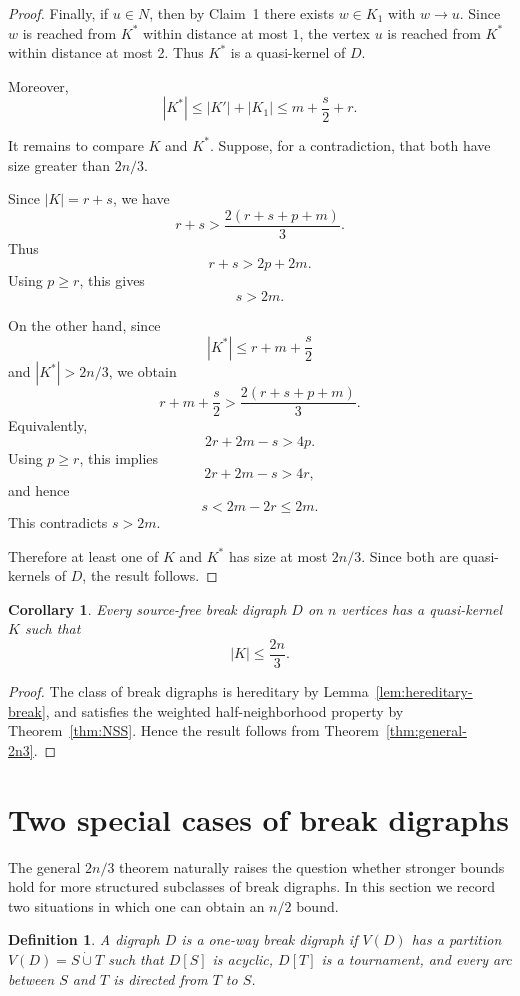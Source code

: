 \documentclass[11pt,a4paper]{article}
\newtheorem{corollary}[theorem]{Corollary}
\newtheorem{definition}[theorem]{Definition}
\begin{document}
\begin{proof}
Finally, if \(u\in N\), then by Claim~1 there exists \(w\in K_1\)
with \(w\to u\).
Since \(w\) is reached from \(K^*\) within distance at most \(1\),
the vertex \(u\) is reached from \(K^*\) within distance at most 2.
Thus \(K^*\) is a quasi-kernel of \(D\).

Moreover,
\[
    |K^*|
    \le
    |K'|+|K_1|
    \le
    m+\frac s2+r.
\]

It remains to compare \(K\) and \(K^*\).
Suppose, for a contradiction, that both have size greater than \(2n/3\).

Since \(|K|=r+s\), we have
\[
    r+s>\frac{2(r+s+p+m)}{3}.
\]
Thus
\[
    r+s>2p+2m.
\]
Using \(p\ge r\), this gives
\[
    s>2m.
\]

On the other hand, since
\[
    |K^*|\le r+m+\frac s2
\]
and \(|K^*|>2n/3\), we obtain
\[
    r+m+\frac s2>\frac{2(r+s+p+m)}{3}.
\]
Equivalently,
\[
    2r+2m-s>4p.
\]
Using \(p\ge r\), this implies
\[
    2r+2m-s>4r,
\]
and hence
\[
    s<2m-2r\le 2m.
\]
This contradicts \(s>2m\).

Therefore at least one of \(K\) and \(K^*\) has size at most \(2n/3\).
Since both are quasi-kernels of \(D\), the result follows.
\end{proof}

\begin{corollary}
Every source-free break digraph \(D\) on \(n\) vertices has a quasi-kernel
\(K\) such that
\[
    |K|\le \frac{2n}{3}.
\]
\end{corollary}

\begin{proof}
The class of break digraphs is hereditary by
Lemma~\ref{lem:hereditary-break}, and satisfies the weighted
half-neighborhood property by Theorem~\ref{thm:NSS}.
Hence the result follows from Theorem~\ref{thm:general-2n3}.
\end{proof}



\section{Two special cases of break digraphs}

The general \(2n/3\) theorem naturally raises the question whether stronger
bounds hold for more structured subclasses of break digraphs. In this section
we record two situations in which one can obtain an \(n/2\) bound.

\begin{definition}
A digraph \(D\) is a \emph{one-way break digraph} if \(V(D)\) has a partition
\(V(D)=S\dot\cup T\) such that \(D[S]\) is acyclic, \(D[T]\) is a tournament,
and every arc between \(S\) and \(T\) is directed from \(T\) to \(S\).
\end{definition}
\end{document}
